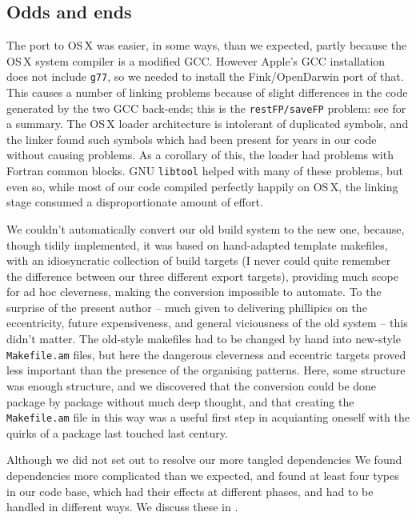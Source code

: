 \documentclass{speauth}
\begin{document}
\subsection{Odds and ends}

The port to OS\,X was easier, in some ways, than we expected, partly
because the OS\,X system compiler is a modified GCC.  However Apple's
GCC installation does not include \texttt{g77}, so we needed to
install the Fink/OpenDarwin port of that.  This causes a number of
linking problems because of slight differences in the code generated
by the two GCC back-ends; this is the \texttt{restFP/saveFP} problem:
see \cite{gray04} for a summary.  The OS\,X loader architecture is
intolerant of duplicated symbols, and the linker found such symbols
which had been present for years in our code without causing problems.
As a corollary of this, the loader had problems with Fortran common
blocks.  GNU \texttt{libtool} helped with many of these problems, but
even so, while most of our code compiled perfectly happily on OS\,X,
the linking stage consumed a disproportionate amount of effort.

We couldn't automatically convert our old build system to the new one,
because, though tidily implemented, it was based on hand-adapted
template makefiles, with an idiosyncratic collection of build targets
(I never could quite remember the difference between our three
different export targets), providing much scope for ad hoc
cleverness, making the conversion impossible to automate.  To the
surprise of the present author -- much given to 
delivering phillipics on the eccentricity, future expensiveness, and
general viciousness of the old system -- this didn't matter.  The
old-style makefiles had to be changed by hand into new-style
\texttt{Makefile.am} files, but here the dangerous cleverness and
eccentric targets proved less important than the presence of the
organising patterns.  Here, some structure was enough structure, and
we discovered that the conversion could be done
package by package without much deep thought, and that creating the
\texttt{Makefile.am} file in this way was a useful first step in
acquianting oneself with the quirks of a package last touched last century.

Although we did not set out to resolve our more tangled dependencies
We found dependencies more complicated than we expected, and found at
least four types in our code base, which had their effects at
different phases, and had to be handled in different ways.  We discuss
these in .
\end{document}
